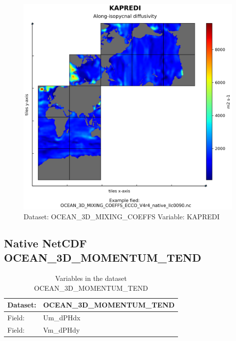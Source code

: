 \begin{figure}[H]
\centering
\includegraphics[width=\textwidth]{../images/plots/native_plots/Ocean_3D_Gent-Mcwilliams_Redi_and_Background_Vertical_Diffusivity_Coefficients_for_the_Lat-Lon-Cap_90_(llc90)_Native_Model_Grid_(Version_4_Release_4)/KAPREDI.png}
\caption{Dataset: OCEAN\_3D\_MIXING\_COEFFS Variable: KAPREDI}
\label{tab:table-OCEAN_3D_MIXING_COEFFS_KAPREDI-Plot}
\end{figure}
\pagebreak
\subsection{Native NetCDF OCEAN\_3D\_MOMENTUM\_TEND}
\newp
\begin{longtable}{|p{}|p{}|}
\caption{Variables in the dataset OCEAN\_3D\_MOMENTUM\_TEND}
\label{tab:table-OCEAN_3D_MOMENTUM_TEND-fields} \\ 
\hline \endhead \hline \endfoot
\rowcolor{lightgray} \textbf{Dataset:} & \textbf{OCEAN\_3D\_MOMENTUM\_TEND} \\ \hline
Field: &Um\_dPHdx \\ \hline
Field: &Vm\_dPHdy \\ \hline
\end{longtable}

\pagebreak
